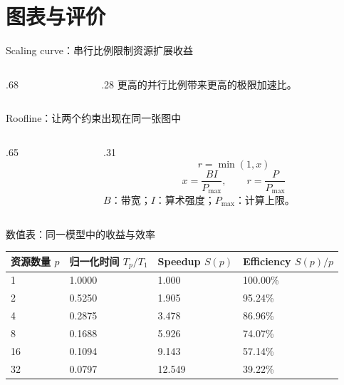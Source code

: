\section{图表与评价}
\begin{frame}{Scaling curve：串行比例限制资源扩展收益}
\begin{columns}[T,onlytextwidth]
\begin{column}{.68\textwidth}\end{column}
\begin{column}{.28\textwidth}
更高的并行比例带来更高的极限加速比。
\par\vspace{2mm}
\par\vspace{2mm}
\end{column}
\end{columns}
\end{frame}

\begin{frame}{Roofline：让两个约束出现在同一张图中}
\begin{columns}[T,onlytextwidth]
\begin{column}{.65\textwidth}\end{column}
\begin{column}{.31\textwidth}
\[r=\min(1,x)\]
\[x=\frac{BI}{P_{\max}},\qquad r=\frac{P}{P_{\max}}\]
\smalltext $B$：带宽；$I$：算术强度；$P_{\max}$：计算上限。
\par\vspace{3mm}
\end{column}
\end{columns}
\end{frame}

\begin{frame}{数值表：同一模型中的收益与效率}
\renewcommand{\arraystretch}{1.10}
\begin{tabularx}{\textwidth}{@{}XXXX@{}}
\toprule 资源数量 $p$ & 归一化时间 $T_p/T_1$ & Speedup $S(p)$ & Efficiency $S(p)/p$ \\\midrule
1  & 1.0000 & 1.000 & 100.00\% \\
2  & 0.5250 & 1.905 & 95.24\% \\
4  & 0.2875 & 3.478 & 86.96\% \\
8  & 0.1688 & 5.926 & 74.07\% \\
16 & 0.1094 & 9.143 & 57.14\% \\
32 & 0.0797 & 12.549 & 39.22\% \\\bottomrule
\end{tabularx}
\vspace{2mm}
\end{frame}

